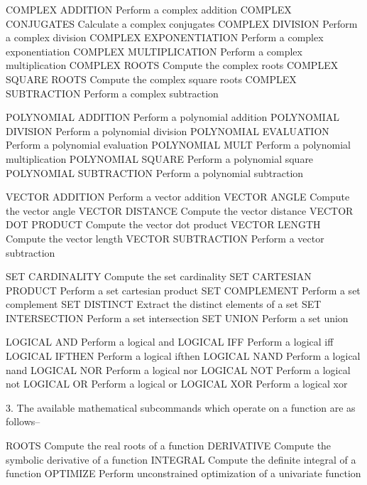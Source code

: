       COMPLEX ADDITION       Perform a complex addition
      COMPLEX CONJUGATES     Calculate a complex conjugates
      COMPLEX DIVISION       Perform a complex division
      COMPLEX EXPONENTIATION Perform a complex exponentiation
      COMPLEX MULTIPLICATION Perform a complex multiplication
      COMPLEX ROOTS          Compute the complex roots
      COMPLEX SQUARE ROOTS   Compute the complex square roots
      COMPLEX SUBTRACTION    Perform a complex subtraction
 
      POLYNOMIAL ADDITION    Perform a polynomial addition
      POLYNOMIAL DIVISION    Perform a polynomial division
      POLYNOMIAL EVALUATION  Perform a polynomial evaluation
      POLYNOMIAL MULT        Perform a polynomial multiplication
      POLYNOMIAL SQUARE      Perform a polynomial square
      POLYNOMIAL SUBTRACTION Perform a polynomial subtraction
 
      VECTOR ADDITION        Perform a vector addition
      VECTOR ANGLE           Compute the vector angle
      VECTOR DISTANCE        Compute the vector distance
      VECTOR DOT PRODUCT     Compute the vector dot product
      VECTOR LENGTH          Compute the vector length
      VECTOR SUBTRACTION     Perform a vector subtraction
 
      SET CARDINALITY        Compute the set cardinality
      SET CARTESIAN PRODUCT  Perform a set cartesian product
      SET COMPLEMENT         Perform a set complement
      SET DISTINCT           Extract the distinct elements of a set
      SET INTERSECTION       Perform a set intersection
      SET UNION              Perform a set union
 
      LOGICAL AND            Perform a logical and
      LOGICAL IFF            Perform a logical iff
      LOGICAL IFTHEN         Perform a logical ifthen
      LOGICAL NAND           Perform a logical nand
      LOGICAL NOR            Perform a logical nor
      LOGICAL NOT            Perform a logical not
      LOGICAL OR             Perform a logical or
      LOGICAL XOR            Perform a logical xor
 
 
3. The available mathematical subcommands which operate on a function
   are as follows--
 
      ROOTS                  Compute the real roots of a function
      DERIVATIVE             Compute the symbolic derivative of a
                             function
      INTEGRAL               Compute the definite integral of a
                             function
      OPTIMIZE               Perform unconstrained optimization of a
                             univariate function
 
